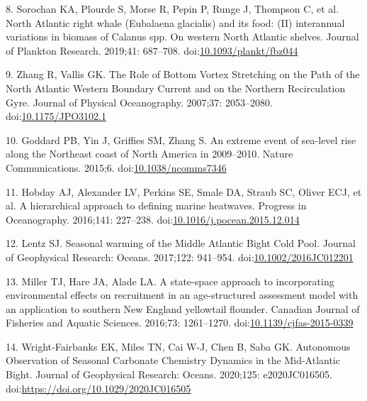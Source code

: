 \documentclass[
  10pt,
]{article}
\begin{document}
\leavevmode\hypertarget{ref-sorochan_north_2019}{}%
8. Sorochan KA, Plourde S, Morse R, Pepin P, Runge J, Thompson C, et al.
North Atlantic right whale (Eubalaena glacialis) and its food: (II)
interannual variations in biomass of Calanus spp. On western North
Atlantic shelves. Journal of Plankton Research. 2019;41: 687--708.
doi:\href{https://doi.org/10.1093/plankt/fbz044}{10.1093/plankt/fbz044}

\leavevmode\hypertarget{ref-zhang_role_2007}{}%
9. Zhang R, Vallis GK. The Role of Bottom Vortex Stretching on the Path
of the North Atlantic Western Boundary Current and on the Northern
Recirculation Gyre. Journal of Physical Oceanography. 2007;37:
2053--2080.
doi:\href{https://doi.org/10.1175/JPO3102.1}{10.1175/JPO3102.1}

\leavevmode\hypertarget{ref-goddard_extreme_2015}{}%
10. Goddard PB, Yin J, Griffies SM, Zhang S. An extreme event of
sea-level rise along the Northeast coast of North America in 2009--2010.
Nature Communications. 2015;6.
doi:\href{https://doi.org/10.1038/ncomms7346}{10.1038/ncomms7346}

\leavevmode\hypertarget{ref-hobday_hierarchical_2016}{}%
11. Hobday AJ, Alexander LV, Perkins SE, Smale DA, Straub SC, Oliver
ECJ, et al. A hierarchical approach to defining marine heatwaves.
Progress in Oceanography. 2016;141: 227--238.
doi:\href{https://doi.org/10.1016/j.pocean.2015.12.014}{10.1016/j.pocean.2015.12.014}

\leavevmode\hypertarget{ref-lentz_seasonal_2017}{}%
12. Lentz SJ. Seasonal warming of the Middle Atlantic Bight Cold Pool.
Journal of Geophysical Research: Oceans. 2017;122: 941--954.
doi:\href{https://doi.org/10.1002/2016JC012201}{10.1002/2016JC012201}

\leavevmode\hypertarget{ref-miller_state-space_2016}{}%
13. Miller TJ, Hare JA, Alade LA. A state-space approach to
incorporating environmental effects on recruitment in an age-structured
assessment model with an application to southern New England yellowtail
flounder. Canadian Journal of Fisheries and Aquatic Sciences. 2016;73:
1261--1270.
doi:\href{https://doi.org/10.1139/cjfas-2015-0339}{10.1139/cjfas-2015-0339}

\leavevmode\hypertarget{ref-wrightfairbanks_autonomous_2020}{}%
14. Wright‐Fairbanks EK, Miles TN, Cai W-J, Chen B, Saba GK. Autonomous
Observation of Seasonal Carbonate Chemistry Dynamics in the Mid-Atlantic
Bight. Journal of Geophysical Research: Oceans. 2020;125: e2020JC016505.
doi:\href{https://doi.org/https://doi.org/10.1029/2020JC016505}{https://doi.org/10.1029/2020JC016505}
\end{document}
